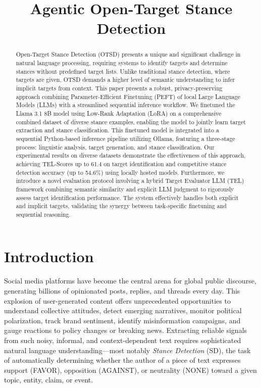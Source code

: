 \documentclass[conference]{IEEEtran}
\begin{document}
\title{Agentic Open-Target Stance Detection 
}



\maketitle

\begin{abstract}
Open-Target Stance Detection (OTSD) presents a unique and significant challenge in natural language processing, requiring systems to identify targets and determine stances without predefined target lists. Unlike traditional stance detection, where targets are given, OTSD demands a higher level of semantic understanding to infer implicit targets from context. This paper presents a robust, privacy-preserving approach combining Parameter-Efficient Finetuning (PEFT) of local Large Language Models (LLMs) with a streamlined sequential inference workflow. We finetuned the Llama 3.1 8B model using Low-Rank Adaptation (LoRA) on a comprehensive combined dataset of diverse stance examples, enabling the model to jointly learn target extraction and stance classification. This finetuned model is integrated into a sequential Python-based inference pipeline utilizing Ollama, featuring a three-stage process: linguistic analysis, target generation, and stance classification. Our experimental results on diverse datasets demonstrate the effectiveness of this approach, achieving TEL-Scores up to 61.4 on target identification and competitive stance detection accuracy (up to 54.6\%) using locally hosted models. Furthermore, we introduce a novel evaluation protocol involving a hybrid Target Evaluator LLM (TEL) framework combining semantic similarity and explicit LLM judgment to rigorously assess target identification performance. The system effectively handles both explicit and implicit targets, validating the synergy between task-specific finetuning and sequential reasoning.
\end{abstract}

\section{Introduction}

Social media platforms have become the central arena for global public discourse, generating billions of opinionated posts, replies, and threads every day. This explosion of user-generated content offers unprecedented opportunities to understand collective attitudes, detect emerging narratives, monitor political polarization, track brand sentiment, identify misinformation campaigns, and gauge reactions to policy changes or breaking news. Extracting reliable signals from such noisy, informal, and context-dependent text requires sophisticated natural language understanding—most notably \emph{Stance Detection} (SD), the task of automatically determining whether the author of a piece of text expresses support (FAVOR), opposition (AGAINST), or neutrality (NONE) toward a given topic, entity, claim, or event.
\end{document}
